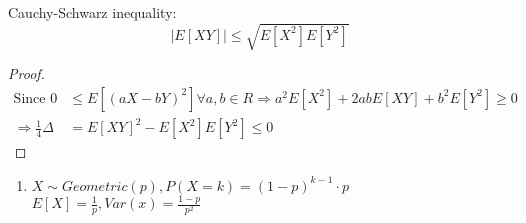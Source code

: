 Cauchy-Schwarz inequality: $$
    |E[XY]|\leq \sqrt{E[X^2]E[Y^2]}
$$
\begin{proof}
    \begin{align*}{}{}
    \text{Since }0&\leq E[(aX-bY)^2]\forall a,b \in R \Rightarrow a^2E[X^2]+2abE[XY]+b^2E[Y^2]\geq0\\
    \Rightarrow \frac{1}{4}\Delta&=E[XY]^2-E[X^2]E[Y^2]\leq 0
    \end{align*}
\end{proof}
\begin{example}[]{}
 \begin{enumerate}[label=\circled{\arabic*}] 
 \item $ X\sim Geometric(p),P(X=k)=(1-p)^{k-1}\cdot p $\\
 $ E[X]=\frac{1}{p},Var(x)=\frac{1-p}{p^2} $ 
 \end{enumerate}
\end{example}

